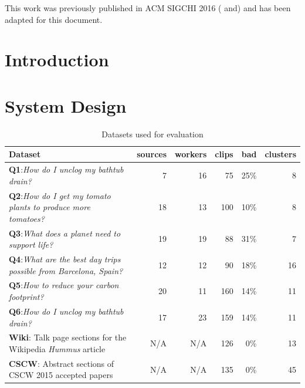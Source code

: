 
{\rmfamily
This work was previously published in ACM SIGCHI 2016 (\cite{alloy} and\cite{ka}) and has been adapted for this document.
}




\section{Introduction}


% 

\section{System Design}


% 


\begin{table}
  \centering
  \footnotesize

  \begin{tabular}{ l r r r r r }
    \hline
	Dataset &
    sources &
    workers &
    clips &
	bad &
    clusters \\
    \hline
	\textbf{Q1}:\emph{How do I unclog my bathtub drain?} & 7 & 16 & 75 & 25\% & 8 \\
  
	\textbf{Q2}:\emph{How do I get my tomato plants to produce more tomatoes?} & 18 & 13 & 100 & 10\% & 8 \\
 
	\textbf{Q3}:\emph{What does a planet need to support life?} & 19 & 19 & 88 & 31\% & 7  \\

	\textbf{Q4}:\emph{What are the best day trips possible from Barcelona, Spain?} & 12 & 12 & 90 & 18\% & 16  \\

	\textbf{Q5}:\emph{How to reduce your carbon footprint?} & 20 & 11 & 160 & 14\% & 11 \\

	\textbf{Q6}:\emph{How do I unclog my bathtub drain?} & 17 & 23 & 159 & 14\% & 11 \\
	
	\textbf{Wiki}: Talk page sections for the Wikipedia \emph{Hummus} article & N/A & N/A & 126 & 0\% & 13 \\ 
	
	\textbf{CSCW}: Abstract sections of CSCW 2015 accepted papers & N/A & N/A & 135 & 0\% & 45 \\ 
    \hline
  \end{tabular}
  \caption{Datasets used for evaluation}
  \label{tab:datasets}
\end{table}

